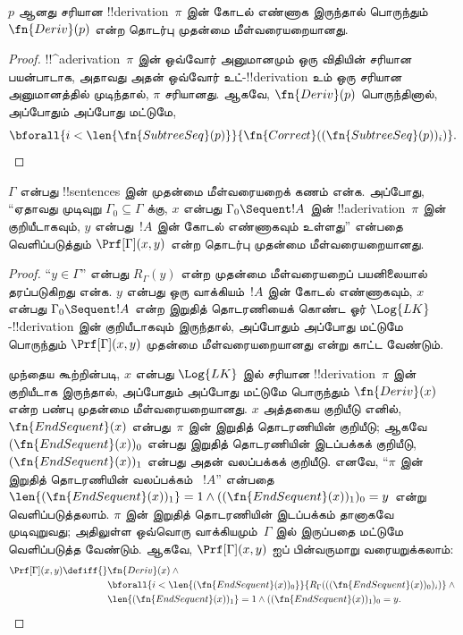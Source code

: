 \documentclass[../../../include/open-logic-section]{subfiles}
\begin{document}
\begin{prop}
  $p$ ஆனது சரியான !!{derivation}~$\pi$ இன் கோடல் எண்ணாக இருந்தால் பொருந்தும்
  $\fn{Deriv}(p)$ என்ற தொடர்பு முதன்மை மீள்வரையறையானது.
\end{prop}

\begin{proof}
  !!^a{derivation}~$\pi$ இன் ஒவ்வோர் அனுமானமும் ஒரு விதியின் சரியான
  பயன்பாடாக, அதாவது அதன் ஒவ்வோர் உட்-!!{derivation} உம் ஒரு சரியான
  அனுமானத்தில் முடிந்தால், $\pi$ சரியானது. ஆகவே,
  $\fn{Deriv}(p)$ பொருந்தினால், அப்போதும் அப்போது மட்டுமே,
  \[
  \bforall{i<\len{\fn{SubtreeSeq}(p)}}{\fn{Correct}((\fn{SubtreeSeq}(p))_i)}.
  \]
\end{proof}


\begin{prop}
$\Gamma$ என்பது !!{sentence}s இன் முதன்மை மீள்வரையறைக் கணம் என்க. அப்போது,
“ஏதாவது முடிவுறு $\Gamma_0 \subseteq \Gamma$ க்கு,
$x$ என்பது $\Gamma_0 \Sequent !A$ இன் !!a{derivation}~$\pi$ இன்
குறியீடாகவும், $y$ என்பது~$!A$ இன் கோடல் எண்ணாகவும் உள்ளது” என்பதை
வெளிப்படுத்தும் $\Prf[\Gamma](x, y)$ என்ற தொடர்பு முதன்மை
மீள்வரையறையானது.
\end{prop}

\begin{proof}
“$y \in \Gamma$” என்பது $R_\Gamma(y)$ என்ற முதன்மை மீள்வரையறைப்
பயனிலையால் தரப்படுகிறது என்க. $y$ என்பது ஒரு வாக்கியம்~$!A$ இன் கோடல்
எண்ணாகவும், $x$ என்பது $\Gamma_0 \Sequent !A$ என்ற இறுதித் தொடரணியைக்
கொண்ட ஓர் $\Log{LK}$-!!{derivation} இன் குறியீடாகவும் இருந்தால்,
அப்போதும் அப்போது மட்டுமே பொருந்தும் $\Prf[\Gamma](x, y)$ முதன்மை
மீள்வரையறையானது என்று காட்ட வேண்டும்.

முந்தைய கூற்றின்படி, $x$ என்பது $\Log{LK}$ இல் சரியான
!!{derivation}~$\pi$ இன் குறியீடாக இருந்தால், அப்போதும் அப்போது மட்டுமே
பொருந்தும் $\fn{Deriv}(x)$ என்ற பண்பு முதன்மை மீள்வரையறையானது. $x$
அத்தகைய குறியீடு எனில், $\fn{EndSequent}(x)$ என்பது~$\pi$ இன் இறுதித்
தொடரணியின் குறியீடு; ஆகவே $(\fn{EndSequent}(x))_0$ என்பது இறுதித்
தொடரணியின் இடப்பக்கக் குறியீடு, $(\fn{EndSequent}(x))_1$ என்பது அதன்
வலப்பக்கக் குறியீடு. எனவே, “$\pi$ இன் இறுதித் தொடரணியின் வலப்பக்கம்
~$!A$” என்பதை
$\len{(\fn{EndSequent}(x))_1} = 1 \land ((\fn{EndSequent}(x))_1)_0 =
y$ என்று வெளிப்படுத்தலாம். $\pi$ இன் இறுதித் தொடரணியின் இடப்பக்கம்
தானாகவே முடிவுறுவது; அதிலுள்ள ஒவ்வொரு வாக்கியமும்~$\Gamma$ இல் இருப்பதை
மட்டுமே வெளிப்படுத்த வேண்டும். ஆகவே, $\Prf[\Gamma](x, y)$ ஐப் பின்வருமாறு
வரையறுக்கலாம்:
\begin{align*}
\Prf[\Gamma](x, y) \defiff {}&
\fn{Deriv}(x) \land {} \\
& \bforall{i <
  \len{(\fn{EndSequent}(x))_0}}{R_\Gamma(((\fn{EndSequent}(x))_0)_i)} \land {}\\
& \len{(\fn{EndSequent}(x))_1} = 1 \land ((\fn{EndSequent}(x))_1)_0 = y.
\end{align*}
\end{proof}
\end{document}
